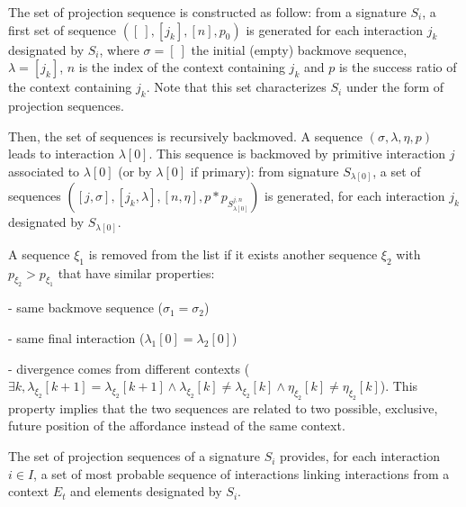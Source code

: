 \documentclass[conference]{IEEEtran}
\begin{document}
The set of projection sequence is constructed as follow: from a signature $S_i$, a first set of sequence $([\:], [j_k], [n], p_0)$ is generated for each interaction $j_k$ designated by $S_i$, where $\sigma=[\: ]$ the initial (empty) backmove sequence, $\lambda=[j_k]$, $n$ is the index of the context containing $j_k$ and $p$ is the success ratio of the context containing $j_k$. Note that this set characterizes $S_i$ under the form of projection sequences.

Then, the set of sequences is recursively backmoved. A sequence $(\sigma, \lambda, \eta, p)$ leads to interaction $\lambda[0]$. This sequence is backmoved by primitive interaction $j$ associated to $\lambda[0]$ (or by $\lambda[0]$ if primary): from signature $S_{\lambda[0]}$, a set of sequences $([j,\sigma], [j_k,\lambda], [n,\eta], p*p_{S_{\lambda[0]}^{j,n}})$ is generated, for each interaction $j_k$ designated by $S_{\lambda[0]}$.

A sequence $\xi_1$ is removed from the list if it exists another sequence $\xi_2$ with $p_{\xi_2}>p_{\xi_1}$ that have similar properties:

- same backmove sequence ($\sigma_1=\sigma_2$)

- same final interaction ($\lambda_1[0]=\lambda_2[0]$)

- divergence comes from different contexts ($\exists k, \lambda_{\xi_2}[k+1]=\lambda_{\xi_2}[k+1] \wedge \lambda_{\xi_2}[k] \neq \lambda_{\xi_2}[k] \wedge \eta_{\xi_2}[k] \neq\eta_{\xi_2}[k]$). This property implies that the two sequences are related to two possible, exclusive, future position of the affordance instead of the same context.

The set of projection sequences of a signature $S_i$ provides, for each interaction $i \in I$, a set of most probable sequence of interactions linking interactions from a context $E_t$ and elements designated by $S_i$.







\end{document}
